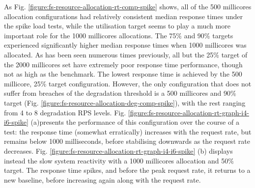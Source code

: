 As Fig. \ref{figure:fs-resource-allocation-rt-comp-spike} shows, all of the 500 millicores allocation configurations had relatively consistent median response times under the spike load tests, while the utilisation target seems to play a much more important role for the 1000 millicores allocations. The 75\% and 90\% targets experienced significantly higher median response times when 1000 millicores was allocated. As has been seen numerous times previously, all but the 25\% target of the 2000 millicores set have extremely poor response time performance, though not as high as the benchmark. The lowest response time is achieved by the 500 millicore, 25\% target configuration. However, the only configuration that does not suffer from breaches of the degradation threshold is a 500 millicores and 90\% target (Fig. \ref{figure:fs-resource-allocation-deg-comp-spike}), with the rest ranging from 4 to 8 degradation RPS levels. Fig. \ref{figure:fs-resource-allocation-rt-graph-i4-i6-spike} (a)presents the performance of this configuration over the course of a test: the response time (somewhat erratically) increases with the request rate, but remains below 1000 milliseconds, before stabilising downwards as the request rate decreases. Fig. \ref{figure:fs-resource-allocation-rt-graph-i4-i6-spike} (b) displays instead the slow system reactivity with a 1000 millicores allocation and 50\% target. The response time spikes, and before the peak request rate, it returns to a new baseline, before increasing again along with the request rate.

